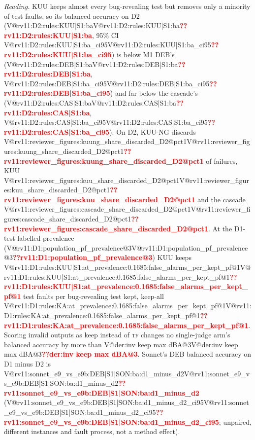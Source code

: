 \documentclass[pdflatex,iicol,sn-mathphys-num]{sn-jnl}
\makeatletter
\newcommand{\V}[1]{\ifcsname V@#1\endcsname\csname V@#1\endcsname\else\textbf{\textcolor{red}{??#1}}\fi}
\newcommand{\TF}{\textsc{tf}}
\makeatother
\begin{document}
\begin{appendices}
\noindent\textit{Reading.} KUU keeps almost every bug-revealing test but removes only a minority of test faults, so its balanced accuracy on D2 (\V{rv11:D2:rules:KUU|S1:ba}, 95\% CI \V{rv11:D2:rules:KUU|S1:ba_ci95}) is below M1 DEB's (\V{rv11:D2:rules:DEB|S1:ba}, \V{rv11:D2:rules:DEB|S1:ba_ci95}) and far below the cascade's (\V{rv11:D2:rules:CAS|S1:ba}, \V{rv11:D2:rules:CAS|S1:ba_ci95}). On D2, KUU-NG discards \V{rv11:reviewer_figures:kuung_share_discarded_D2@pct1} of failures, KUU \V{rv11:reviewer_figures:kuu_share_discarded_D2@pct1} and the cascade \V{rv11:reviewer_figures:cascade_share_discarded_D2@pct1}. At the D1-test labelled prevalence (\V{rv11:D1:population_pf_prevalence@3}) KUU keeps \V{rv11:D1:rules:KUU|S1:at_prevalence:0.1685:false_alarms_per_kept_pf@1} test faults per bug-revealing test kept, keep-all \V{rv11:D1:rules:KA:at_prevalence:0.1685:false_alarms_per_kept_pf@1}. Scoring invalid outputs as keep instead of \TF{} changes no single-judge arm's balanced accuracy by more than \V{der:inv keep max dBA@3}. Sonnet's DEB balanced accuracy on D1 minus D2 is \V{rv11:sonnet_e9_vs_e9b:DEB|S1|SON:ba:d1_minus_d2} (\V{rv11:sonnet_e9_vs_e9b:DEB|S1|SON:ba:d1_minus_d2_ci95}; unpaired, different instances and fault process, not a method effect).


\end{appendices}
\end{document}
